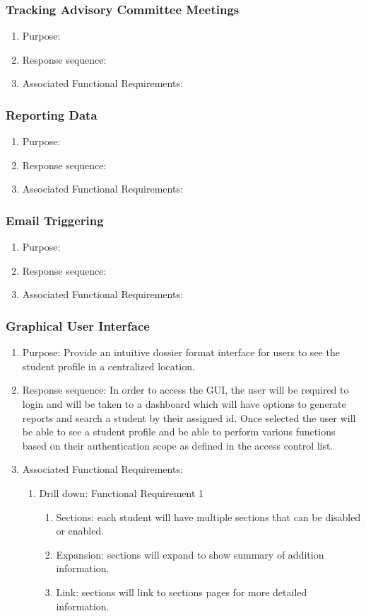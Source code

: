 \documentclass{journal}
\begin{document}
\subsubsection{Tracking Advisory Committee Meetings}
\begin{enumerate}
\item Purpose:
\item Response sequence:
\item Associated Functional Requirements:
\end{enumerate}


\subsubsection{Reporting Data}
\begin{enumerate}
\item Purpose:
\item Response sequence:
\item Associated Functional Requirements:
\end{enumerate}
\subsubsection{Email Triggering}
\begin{enumerate}
\item Purpose:
\item Response sequence:
\item Associated Functional Requirements:
\end{enumerate}

\subsubsection{Graphical User Interface}
\begin{enumerate}
\item Purpose: Provide an intuitive dossier format interface for users to see the student profile in a centralized location.
\item Response sequence: In order to access the GUI, the user will be required to login and will be taken to a dashboard which will have options to generate reports and search a student by their assigned id. Once selected the user will be able to see a student profile and be able to perform various functions based on their authentication scope as defined in the access control list.
\item Associated Functional Requirements:
\begin{enumerate}
\item Drill down: Functional Requirement 1
\begin{enumerate}
\item Sections: each student will have multiple sections that can be disabled or enabled.
\item Expansion: sections will expand to show summary of addition information.
\item Link: sections will link to sections pages for more detailed information.
\end{enumerate}
\end{enumerate}
\end{enumerate}
\end{document}
